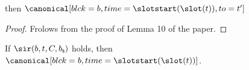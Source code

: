 \documentclass{article}
\begin{document}
\begin{lemma}
    then $\canonical[blck=b,time=\slotstart(\slot(t)),to=t']$
    
\end{lemma}

\begin{proof}
    Frolows from the proof of Lemma 10 of the paper.
\end{proof}


\begin{lemma}\label{lem:ffg-safety-from-sir}
    If $\sir(b,t,C,b_\mathsf{s})$ holds, then $\canonical[blck=b,time=\slotstart(\slot(t))]$.
\end{lemma}
\end{document}
